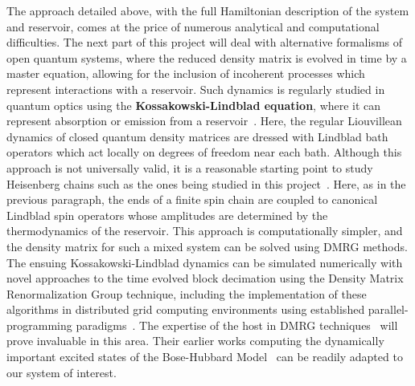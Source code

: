 \documentclass[a4paper,9pt]{article}
\begin{document}
The approach detailed above, with the full Hamiltonian description of the system and reservoir, comes at the price of numerous analytical and computational difficulties. The next part of this project will deal with alternative formalisms of open quantum systems, where the reduced density matrix is evolved in time by a master equation, allowing for the inclusion of incoherent processes which represent interactions with a reservoir. Such dynamics is regularly studied in quantum optics using the \textbf{Kossakowski-Lindblad equation}, where it can represent absorption or emission from a reservoir~\cite{lindblad}. Here, the regular Liouvillean dynamics of closed quantum density matrices are dressed with Lindblad bath operators which act locally on degrees of freedom near each bath. Although this approach is not universally valid, it is a reasonable starting point to study Heisenberg chains such as the ones being studied in this project~\cite{spinchains:lindblad}. Here, as in the previous paragraph, the ends of a 
finite spin chain are coupled to canonical Lindblad spin operators whose amplitudes are determined by the thermodynamics of the reservoir.  This approach is computationally simpler, and the density matrix for such a mixed system can be solved using DMRG methods. The ensuing Kossakowski-Lindblad dynamics  can be simulated numerically with novel approaches to the time evolved block decimation using the Density Matrix Renormalization Group technique, including the implementation of these algorithms in distributed grid computing environments using established parallel-programming paradigms~\cite{white:pdmrg}. The expertise of the host in DMRG techniques~\cite{Zakrzewski:dmrg} will prove invaluable in this area. Their earlier works  computing the dynamically important excited states of the Bose-Hubbard Model~\cite{Zakrzewski:dmrg}  can be readily adapted to our system of interest.
\end{document}
